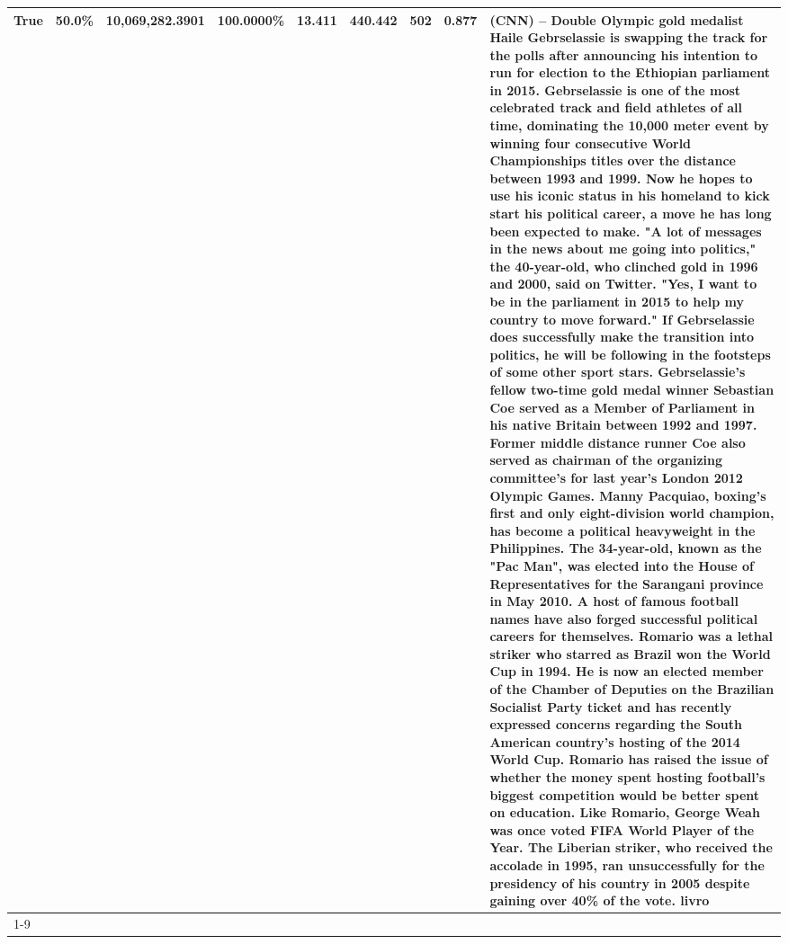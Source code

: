 \begin{table}[H]
{\begin{tabular}{lllrlllll}
True & 50.0\% & 10,069,282.3901 & \bfseries \color{red} 100.0000\% & 13.411 & 440.442 & 502 & 0.877 & (CNN) -- Double Olympic gold medalist Haile Gebrselassie is swapping the track for the polls after announcing his intention to run for election to the Ethiopian parliament in 2015. Gebrselassie is one of the most celebrated track and field athletes of all time, dominating the 10,000 meter event by winning four consecutive World Championships titles over the distance between 1993 and 1999. Now he hopes to use his iconic status in his homeland to kick start his political career, a move he has long been expected to make. "A lot of messages in the news about me going into politics," the 40-year-old, who clinched gold in 1996 and 2000, said on Twitter. "Yes, I want to be in the parliament in 2015 to help my country to move forward." If Gebrselassie does successfully make the transition into politics, he will be following in the footsteps of some other sport stars. Gebrselassie's fellow two-time gold medal winner Sebastian Coe served as a Member of Parliament in his native Britain between 1992 and 1997. Former middle distance runner Coe also served as chairman of the organizing committee's for last year's London 2012 Olympic Games. Manny Pacquiao, boxing's first and only eight-division world champion, has become a political heavyweight in the Philippines. The 34-year-old, known as the "Pac Man", was elected into the House of Representatives for the Sarangani province in May 2010. A host of famous football names have also forged successful political careers for themselves. Romario was a lethal striker who starred as Brazil won the World Cup in 1994. He is now an elected member of the Chamber of Deputies on the Brazilian Socialist Party ticket and has recently expressed concerns regarding the South American country's hosting of the 2014 World Cup. Romario has raised the issue of whether the money spent hosting football's biggest competition would be better spent on education. Like Romario, George Weah was once voted FIFA World Player of the Year. The Liberian striker, who received the accolade in 1995, ran unsuccessfully for the presidency of his country in 2005 despite gaining over 40\% of the vote. livro \\
\cline{1-9}

\end{tabular}}
\end{table}
